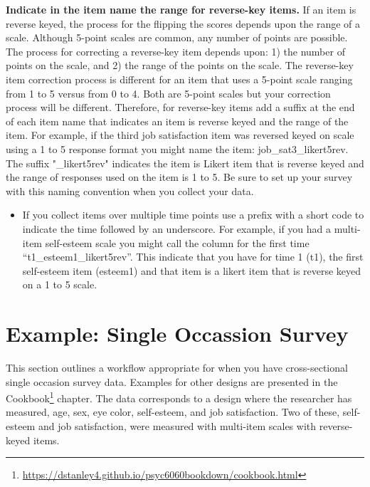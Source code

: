 \documentclass[
]{krantz}
\providecommand{\tightlist}{%
  \setlength{\itemsep}{0pt}\setlength{\parskip}{0pt}}
\renewcommand{\href}[2]{#2\footnote{\url{#1}}}
\begin{document}
\textbf{Indicate in the item name the range for reverse-key items.} If an item is reverse keyed, the process for the flipping the scores depends upon the range of a scale. Although 5-point scales are common, any number of points are possible. The process for correcting a reverse-key item depends upon: 1) the number of points on the scale, and 2) the range of the points on the scale. The reverse-key item correction process is different for an item that uses a 5-point scale ranging from 1 to 5 versus from 0 to 4. Both are 5-point scales but your correction process will be different. Therefore, for reverse-key items add a suffix at the end of each item name that indicates an item is reverse keyed and the range of the item. For example, if the third job satisfaction item was reversed keyed on scale using a 1 to 5 response format you might name the item: job\_sat3\_likert5rev. The suffix "\_likert5rev" indicates the item is Likert item that is reverse keyed and the range of responses used on the item is 1 to 5. Be sure to set up your survey with this naming convention when you collect your data.

\begin{itemize}
\tightlist
\item
  If you collect items over multiple time points use a prefix with a short code to indicate the time followed by an underscore. For example, if you had a multi-item self-esteem scale you might call the column for the first time ``t1\_esteem1\_likert5rev''. This indicate that you have for time 1 (t1), the first self-esteem item (esteem1) and that item is a likert item that is reverse keyed on a 1 to 5 scale.
\end{itemize}

\hypertarget{example-single-occassion-survey}{%
\section{Example: Single Occassion Survey}\label{example-single-occassion-survey}}

This section outlines a workflow appropriate for when you have cross-sectional single occasion survey data. Examples for other designs are presented in the \href{https://dstanley4.github.io/psyc6060bookdown/cookbook.html}{Cookbook} chapter. The data corresponds to a design where the researcher has measured, age, sex, eye color, self-esteem, and job satisfaction. Two of these, self-esteem and job satisfaction, were measured with multi-item scales with reverse-keyed items.
\end{document}
